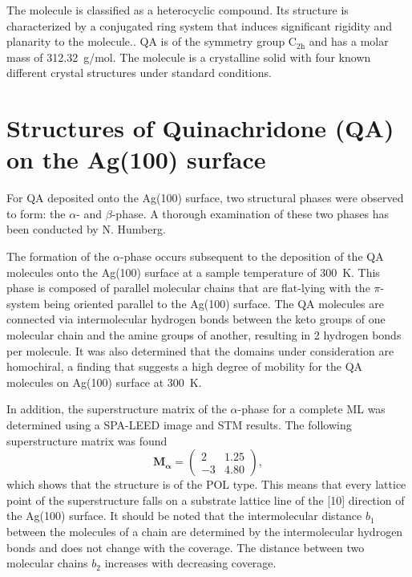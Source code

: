 The molecule is classified as a heterocyclic compound. Its structure is characterized by a conjugated ring system that induces significant rigidity and planarity to the molecule.\autocite{forBiotechnologyInformation2025}. \ac{QA} is of the symmetry group $\mathrm{C_{2h}}$ and has a molar mass of 312.32~\si{g/mol}. The molecule is a crystalline solid with four known different crystal structures under standard conditions.\autocite{Paulus2007,Mizuguchi}


\section{Structures of Quinachridone (QA) on the Ag(100) surface}

For \ac{QA} deposited onto the Ag(100) surface, two structural phases were observed to form: the $\alpha$- and $\beta$-phase. A thorough examination of these two phases has been conducted by N. Humberg.\autocite{Humberg2024, Humberg2020}

The formation of the $\alpha$-phase occurs subsequent to the deposition of the \ac{QA} molecules onto the Ag(100) surface at a sample temperature of 300~\si{K}. This phase is composed of parallel molecular chains that are flat-lying with the $\pi$-system being oriented parallel to the Ag(100) surface. The \ac{QA} molecules are connected via intermolecular hydrogen bonds between the keto groups of one molecular chain and the amine groups of another, resulting in 2 hydrogen bonds per molecule. It was also determined that the domains under consideration are homochiral, a finding that suggests a high degree of mobility for the \ac{QA} molecules on Ag(100) surface at 300~\si{K}.

In addition, the superstructure matrix of the $\alpha$-phase for a complete \ac{ML} was determined using a \ac{SPA-LEED} image and \ac{STM} results. The following superstructure matrix was found
\begin{equation*}
\mathbf{M_\alpha} =\begin{pmatrix}
2 & 1.25 \\
-3 & 4.80 
\end{pmatrix},
\end{equation*}
which shows that the structure is of the \ac{POL} type. This means that every lattice point of the superstructure falls on a substrate lattice line of the [10] direction of the Ag(100) surface. It should be noted that the intermolecular distance $b_1$ between the molecules of a chain are determined by the intermolecular hydrogen bonds and does not change with the coverage. The distance between two molecular chains $b_2$ increases with decreasing coverage.

